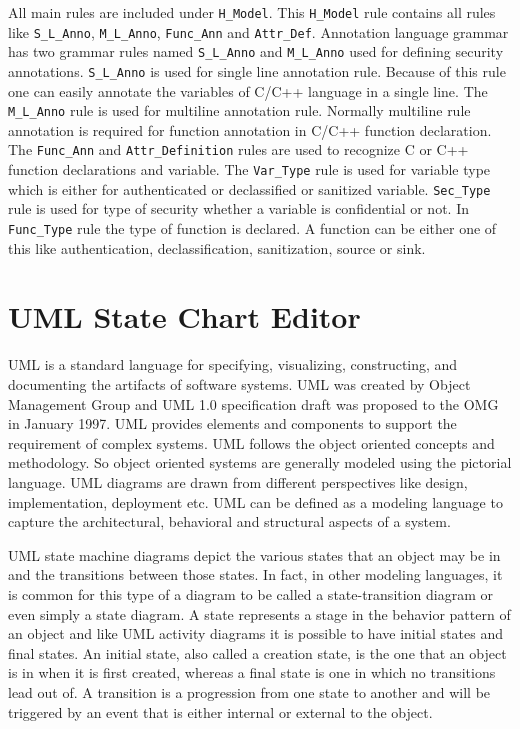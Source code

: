 All main rules are included under \texttt{H\_Model}. This  \texttt{H\_Model} rule contains all rules like \texttt{S\_L\_Anno}, \texttt{M\_L\_Anno}, \texttt{Func\_Ann} and \texttt{Attr\_Def}. Annotation language grammar has two grammar rules named \texttt{S\_L\_Anno} and \texttt{M\_L\_Anno} used for defining security annotations. \texttt{S\_L\_Anno} is used for single line annotation rule. Because of this rule one can easily annotate the variables of C/C++ language in a single line. The \texttt{M\_L\_Anno} rule is used for multiline annotation rule. Normally multiline rule annotation is required for function annotation in C/C++ function declaration. The \texttt{Func\_Ann} and \texttt{Attr\_Definition} rules are used to recognize C or C++ function declarations and variable. The \texttt{Var\_Type} rule is used for variable type which is either for authenticated or declassified or sanitized variable. \texttt{Sec\_Type} rule is used for type of security whether a variable is confidential or not. In \texttt{Func\_Type} rule the type of function is declared. A function can be either one of this like authentication, declassification, sanitization, source or sink.\\


\section{UML State Chart Editor}

UML is a standard language for specifying, visualizing, constructing, and documenting the artifacts of software systems. UML was created by Object Management Group and UML 1.0 specification draft was proposed to the OMG in January 1997. UML provides elements and components to support the requirement of complex systems. UML follows the object oriented concepts and methodology. So object oriented systems are generally modeled using the pictorial language. UML diagrams are drawn from different perspectives like design, implementation, deployment etc. UML can be defined as a modeling language to capture the architectural, behavioral and structural aspects of a system.

UML state machine diagrams depict the various states that an object may be in and the transitions between those states. In fact, in other modeling languages, it is common for this type of a diagram to be called a state-transition diagram or even simply a state diagram. A state represents a stage in the behavior pattern of an object and like UML activity diagrams it is possible to have initial states and final states. An initial state, also called a creation state, is the one that an object is in when it is first created, whereas a final state is one in which no transitions lead out of. A transition is a progression from one state to another and will be triggered by an event that is either internal or external to the object.

